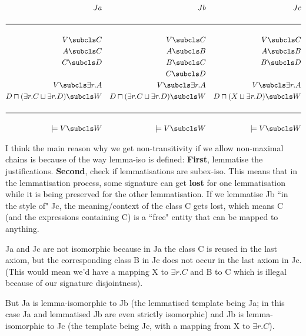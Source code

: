 \documentclass[11pt,a4paper]{article}
\author{Samantha Bail}
\begin{document}
\begin{align*}
Ja &&  Jb && Jc \\
 &&   && \\
\hline
 &&   &&  \\
 V \subcls C && V \subcls C && V \subcls C\\
A \subcls C && A \subcls B && A \subcls B\\
C \subcls D && B \subcls C && B \subcls D\\
&& C \subcls D &&  \\
V  \subcls \exists r.A && V \subcls \exists r.A && V  \subcls \exists r.A \\
D \sqcap (\exists r.C \sqcup \exists r.D) \subcls W && D \sqcap (\exists r.C \sqcup \exists r.D) \subcls W &&  D \sqcap (X \sqcup \exists r.D) \subcls W \\
 &&   && \\
\hline
 &&   &&  \\
\models V \subcls W && \models V \subcls W && \models V \subcls W \\
\end{align*}

I think the main reason why we get non-transitivity if we allow non-maximal chains is because of the way lemma-iso is defined: \textbf{First}, lemmatise the justifications. \textbf{Second}, check if lemmatisations are subex-iso. This means that in the lemmatisation process, some signature can get \textbf{lost} for one lemmatisation while it is being preserved for the other lemmatisation. If we lemmatise Jb ``in the style of" Jc, the meaning/context of the class C gets lost, which means C (and the expressions containing C) is a ``free" entity that can be mapped to anything.

Ja and Jc are not isomorphic because in Ja the class C is reused in the last axiom, but the corresponding class B in Jc does not occur in the last axiom in Jc. (This would mean we'd have a mapping X to $\exists r.C$ and B to C which is illegal because of our signature disjointness).

But Ja is lemma-isomorphic to Jb (the lemmatised template being Ja; in this case Ja and lemmatised Jb are even strictly isomorphic) and Jb is lemma-isomorphic to Jc (the template being Jc, with a mapping from X to $\exists r.C$).
\end{document}
